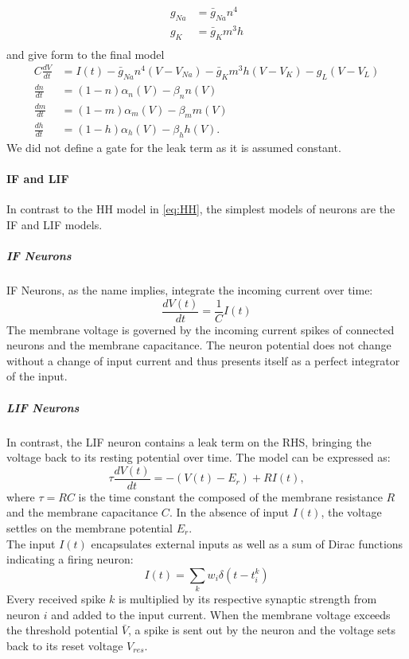 	\begin{equation}
	\begin{aligned}
	g_{Na} &= \bar{g}_{Na} n^4\\
	g_{K} &= \bar{g}_{K} m^3h\\
	\end{aligned}
	\end{equation}
	and give form to the final model
	\begin{equation}\label{eq:HH}
	\begin{aligned}
	C\frac{dV}{dt} &= I(t) -\bar{g}_{Na} n^4(V-V_{Na}) - \bar{g}_{K} m^3h(V-V_{K}) -g_L(V-V_{L})\\
	\frac{dn}{dt} &= (1-n)\alpha_n(V) - \beta_n n (V)\\
	\frac{dm}{dt} &= (1-m)\alpha_m(V) - \beta_m m (V)\\
	\frac{dh}{dt} &= (1-h)\alpha_h(V) - \beta_h h (V).
	\end{aligned}
	\end{equation}
	We did not define a gate for the leak term as it is assumed constant.
	\paragraph{IF and LIF}
	In contrast to the \ac{HH} model in \cref{eq:HH}, the simplest models of neurons are the \ac{IF} and \ac{LIF} models.\\
	\subparagraph{IF Neurons}
	\ac{IF} Neurons, as the name implies, integrate the incoming current over time:
	\begin{equation}
	\frac{d V(t)}{d t} = \frac{1}{C}I(t)
	\end{equation}
	The membrane voltage is governed by the incoming current spikes of connected neurons and the membrane capacitance. The neuron potential does not change without a change of input current and thus presents itself as a perfect integrator of the input.\\
	\subparagraph{\ac{LIF} Neurons}
	In contrast, the \ac{LIF} neuron contains a leak term on the \ac{RHS}, bringing the voltage back to its resting potential over time. The model can be expressed as:
	\begin{equation}
	\tau\frac{dV(t)}{dt} = -(V(t)-E_r) + RI(t),
	\end{equation}
	where $\tau = RC$ is the time constant the composed of the membrane resistance $R$ and the membrane capacitance $C$. In the absence of input $I(t)$, the voltage settles on the membrane potential $E_r$.\\
	The input $I(t)$ encapsulates external inputs as well as a sum of Dirac functions indicating a firing neuron:
	\begin{equation}
	I(t) = \sum_k w_i\delta(t-t^k_i)
	\end{equation}
	Every received spike $k$ is multiplied by its respective synaptic strength from neuron $i$ and added to the input current. When the membrane voltage exceeds the threshold potential $\bar{V}$, a spike is sent out by the neuron and the voltage sets back to its reset voltage $V_{res}$.
